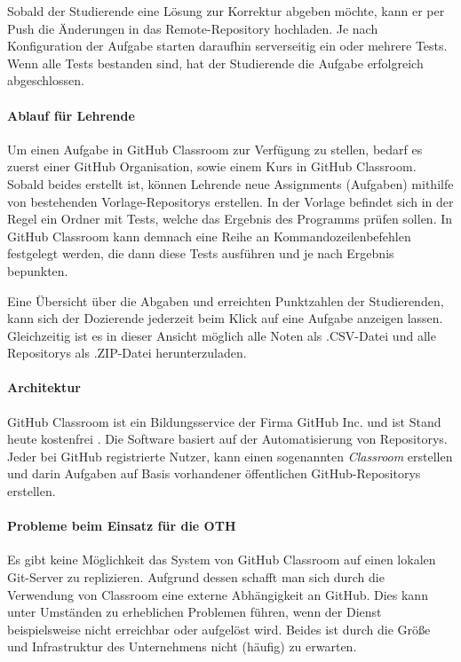 Sobald der Studierende eine Lösung zur Korrektur abgeben möchte, kann er per
Push die Änderungen in das Remote-Repository hochladen. Je nach Konfiguration
der Aufgabe starten daraufhin serverseitig ein oder mehrere Tests. Wenn alle
Tests bestanden sind, hat der Studierende die Aufgabe erfolgreich abgeschlossen.

\paragraph{Ablauf für Lehrende}
Um einen Aufgabe in GitHub Classroom zur Verfügung zu stellen, bedarf es zuerst
einer GitHub Organisation, sowie einem Kurs in GitHub Classroom. Sobald beides
erstellt ist, können Lehrende neue Assignments (Aufgaben) mithilfe von
bestehenden Vorlage-Repositorys erstellen. In der Vorlage befindet sich in der
Regel ein Ordner mit Tests, welche das Ergebnis des Programms prüfen sollen.
In GitHub Classroom kann demnach eine Reihe an Kommandozeilenbefehlen festgelegt
werden, die dann diese Tests ausführen und je nach Ergebnis bepunkten.

Eine Übersicht über die Abgaben und erreichten Punktzahlen der Studierenden,
kann sich der Dozierende jederzeit beim Klick auf eine Aufgabe anzeigen lassen.
Gleichzeitig ist es in dieser Ansicht möglich alle Noten als .CSV-Datei und
alle Repositorys als .ZIP-Datei herunterzuladen.

\paragraph{Architektur} %
GitHub Classroom ist ein Bildungsservice der Firma GitHub Inc. und ist Stand
heute kostenfrei \parencite{github-classroom-kostenlos}. Die Software basiert
auf der Automatisierung von Repositorys. Jeder bei GitHub registrierte Nutzer,
kann einen sogenannten \emph{Classroom} erstellen und darin Aufgaben auf
Basis vorhandener öffentlichen GitHub-Repositorys erstellen.

\paragraph{Probleme beim Einsatz für die OTH}
Es gibt keine Möglichkeit das System von GitHub Classroom auf einen lokalen
Git-Server zu replizieren. Aufgrund dessen schafft man sich durch die
Verwendung von Classroom eine externe Abhängigkeit an GitHub. Dies kann unter
Umständen zu erheblichen Problemen führen, wenn der Dienst beispielsweise
nicht erreichbar oder aufgelöst wird. Beides ist durch die Größe und
Infrastruktur des Unternehmens nicht (häufig) zu erwarten.

